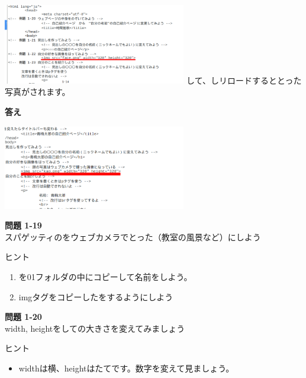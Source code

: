 \begin{minipage}{\textwidth}
  \includegraphics[width=0.6\textwidth]{text01-img/textbook-img171.png}
  \newline
  して、しリロードするととった写真がされます。
\end{minipage}

\flushleft
\textbf{答え}

\includegraphics[width=0.6\textwidth]{text01-img/textbook-img172.png}



\noindent \textbf{問題 1-19}\\
スパゲッティのをウェブカメラでとった（教室の風景など）にしよう

ヒント

\begin{enumerate}
  \item
        を01フォルダの中にコピーして名前をしよう。
  \item
        imgタグをコピーしたをするようにしよう
\end{enumerate}

\noindent \textbf{問題 1-20}\\
width, heightをしての大きさを変えてみましょう

ヒント

\begin{itemize}
  \item
        widthは横、heightはたてです。数字を変えて見ましょう。
\end{itemize}


